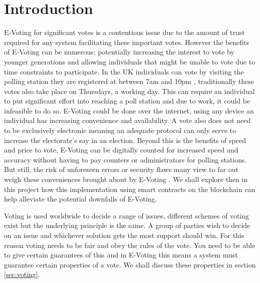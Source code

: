 \documentclass{entcs}
\begin{document}
\section{Introduction}
E-Voting for significant votes is a contentious issue due to the amount of trust required for any system facilitating these important votes. However the benefits of E-Voting can be numerous; potentially increasing the interest to vote by younger generations and allowing individuals that might be unable to vote due to time constraints to participate. In the UK individuals can vote by visiting the polling station they are registered at between 7am and 10pm \cite{pollStations}, traditionally these votes also take place on Thursdays, a working day. This can require an individual to put significant effort into reaching a poll station and due to work, it could be infeasible to do so. E-Voting could be done over the internet, using any device an individual has increasing convenience and availability. A vote also does not need to be exclusively electronic meaning an adequate protocol can only serve to increase the electorate's say in an election. Beyond this is the benefits of speed and price to vote, E-Voting can be digitally counted for increased speed and accuracy without having to pay counters or administrators for polling stations. But still, the risk of unforeseen errors or security flaws many view to far out weigh these conveniences brought about by E-Voting \cite{lauer2004risk}. We shall explore then in this project how this implementation using smart contracts on the blockchain can help alleviate the potential downfalls of E-Voting.

Voting is used worldwide to decide a range of issues, different schemes of voting exist but the underlying principle is the same. A group of parties wish to decide on an issue and whichever solution gets the most support should win. For this reason voting needs to be fair and obey the rules of the vote. You need to be able to give certain guarantees of this and in E-Voting this means a system must guarantee certain properties of a vote. We shall discuss these properties in section \ref{sec:voting}.
\end{document}
